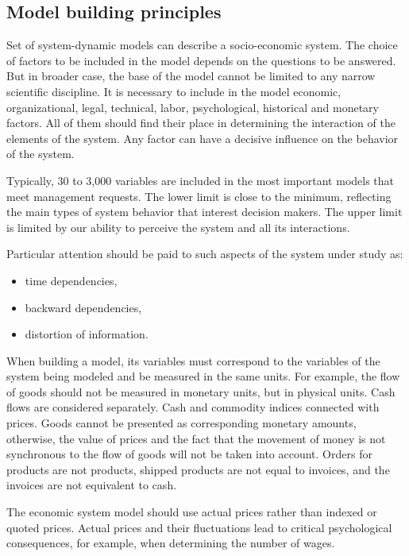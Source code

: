 \documentclass[12pt]{report}
\theoremstyle{definition}
\providecommand{\tightlist}{%
	\setlength{\itemsep}{0pt}\setlength{\parskip}{0pt}}
\begin{document}
\subsection{Model building principles}

Set of system-dynamic models can describe a socio-economic system. 
The choice of factors to be included in the model depends on the questions to be answered.
But in broader case, the base of the model cannot be limited to any narrow scientific discipline.
It is necessary to include in the model economic, organizational, legal, technical, labor, psychological, historical and monetary factors.
All of them should find their place in determining the interaction of the elements of the system. 
Any factor can have a decisive influence on the behavior of the system.

Typically, 30 to 3,000 variables are included in the most important models that meet management requests.
The lower limit is close to the minimum, reflecting the main types of system behavior that interest decision makers.
The upper limit is limited by our ability to perceive the system and all its interactions.

Particular attention should be paid to such aspects of the system under study as:

\begin{itemize}
	\tightlist
	\item time dependencies,
	\item backward dependencies,
	\item distortion of information.
\end{itemize}

When building a model, its variables must correspond to the variables of the system being modeled and be measured in the same units.
For example, the flow of goods should not be measured in monetary units, but in physical units. 
Cash flows are considered separately.
Cash and commodity indices connected with prices.
Goods cannot be presented as corresponding monetary amounts, otherwise, the value of prices and the fact that the movement of money is not synchronous to the flow of goods will not be taken into account.
Orders for products are not products, shipped products are not equal to invoices, and the invoices are not equivalent to cash.

The economic system model should use actual prices rather than indexed or quoted prices.
Actual prices and their fluctuations lead to critical psychological consequences, for example, when determining the number of wages.
\end{document}
